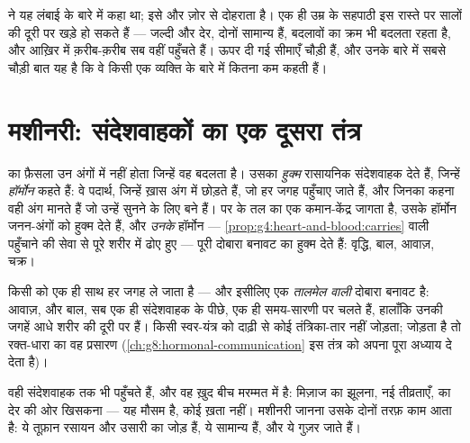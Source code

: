 \begin{remark}[समय-सारणी निजी होती है]\label{rem:g8:puberty:timetable}
 ने यह लंबाई के बारे में कहा था;
 इसे और ज़ोर से दोहराता है। एक ही उम्र के सहपाठी इस रास्ते पर
सालों की दूरी पर खड़े हो सकते हैं --- जल्दी और देर, दोनों सामान्य हैं,
बदलावों का क्रम भी बदलता रहता है, और आख़िर में क़रीब-क़रीब सब वहीं
पहुँचते हैं। ऊपर दी गई सीमाएँ चौड़ी हैं, और उनके बारे में सबसे चौड़ी बात
यह है कि वे किसी एक व्यक्ति के बारे में कितना कम कहती हैं।
\end{remark}

\section{मशीनरी: संदेशवाहकों का एक दूसरा तंत्र}

\begin{definition}[हॉर्मोन, पहली मुलाक़ात]\label{def:g8:puberty:hormones}
 का फ़ैसला उन अंगों में नहीं होता जिन्हें वह बदलता है। उसका
\emph{हुक्म} रासायनिक संदेशवाहक देते हैं, जिन्हें
\emph{हॉर्मोन} कहते हैं: वे पदार्थ, जिन्हें ख़ास अंग
\emph{} में छोड़ते हैं, जो हर जगह पहुँचाए जाते हैं, और जिनका कहना
वही अंग मानते हैं जो उन्हें सुनने के लिए बने हैं।  पर 
के तल का एक कमान-केंद्र जागता है, उसके हॉर्मोन जनन-अंगों को हुक्म देते
हैं, और \emph{उनके} हॉर्मोन ---
\cref{prop:g4:heart-and-blood:carries} वाली पहुँचाने की सेवा से पूरे
शरीर में ढोए हुए --- पूरी दोबारा बनावट का हुक्म देते हैं: वृद्धि, बाल,
आवाज़, चक्र।
\end{definition}

\begin{example}[एक इशारा, कई उसारियाँ]\label{ex:g8:puberty:sites}
 किसी  को एक ही साथ हर जगह ले जाता है --- और इसीलिए
 एक \emph{तालमेल वाली} दोबारा बनावट है: आवाज़,  और बाल, सब
एक ही संदेशवाहक के पीछे, एक ही समय-सारणी पर चलते हैं, हालाँकि उनकी जगहें
आधे शरीर की दूरी पर हैं। किसी स्वर-यंत्र को दाढ़ी से कोई तंत्रिका-तार
नहीं जोड़ता; जोड़ता है तो रक्त-धारा का वह प्रसारण
(\cref{ch:g8:hormonal-communication} इस तंत्र को अपना पूरा अध्याय दे
देता है)।
\end{example}

\begin{remark}[मिज़ाज का मौसम क्यों?]\label{rem:g8:puberty:moods}
वही संदेशवाहक  तक भी पहुँचते हैं, और वह ख़ुद बीच मरम्मत में है:
मिज़ाज का झूलना, नई तीव्रताएँ,  का देर की ओर खिसकना --- यह मौसम है,
कोई ख़ता नहीं। मशीनरी जानना उसके दोनों तरफ़ काम आता है: ये तूफ़ान रसायन
और उसारी का जोड़ हैं, ये सामान्य हैं, और ये गुज़र जाते हैं।
\end{remark}

